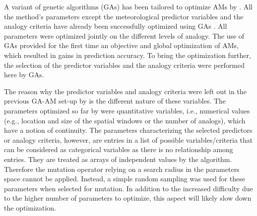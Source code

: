 \documentclass[draft]{agujournal2019}
\begin{document}
A variant of genetic algorithms (GAs) has been tailored to optimize AMs by . All the method's parameters except the meteorological predictor variables and the analogy criteria have already been successfully optimized using GAs \cite{Horton2018a}. All parameters were optimized jointly on the different levels of analogy. The use of GAs provided for the first time an objective and global optimization of AMs, which resulted in gains in prediction accuracy. To bring the optimization further, the selection of the predictor variables and the analogy criteria were performed here by GAs.

The reason why the predictor variables and analogy criteria were left out in the previous GA-AM set-up by  is the different nature of these variables. The parameters optimized so far by  were quantitative variables, i.e., numerical values (e.g., location and size of the spatial windows or the number of analogs), which have a notion of continuity. The parameters characterizing the selected predictors or analogy criteria, however, are entries in a list of possible variables/criteria that can be considered as categorical variables as there is no relationship among entries. They are treated as arrays of independent values by the algorithm. Therefore the mutation operator relying on a search radius in the parameters space \cite{Horton2017a} cannot be applied. Instead, a simple random sampling was used for these parameters when selected for mutation. In addition to the increased difficulty due to the higher number of parameters to optimize, this aspect will likely slow down the optimization.
\end{document}
